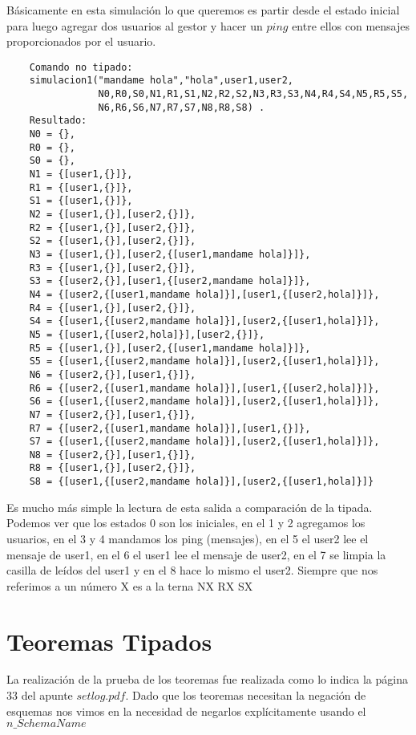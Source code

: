 Básicamente en esta simulación lo que queremos es partir desde el estado inicial para luego agregar dos usuarios al gestor y hacer un $ping$ entre ellos con mensajes proporcionados por el usuario.
\begin{verbatim}
    Comando no tipado:
    simulacion1("mandame hola","hola",user1,user2, 
                N0,R0,S0,N1,R1,S1,N2,R2,S2,N3,R3,S3,N4,R4,S4,N5,R5,S5,
                N6,R6,S6,N7,R7,S7,N8,R8,S8) .
    Resultado:
    N0 = {},  
    R0 = {},  
    S0 = {},  
    N1 = {[user1,{}]},  
    R1 = {[user1,{}]},  
    S1 = {[user1,{}]},  
    N2 = {[user1,{}],[user2,{}]},  
    R2 = {[user1,{}],[user2,{}]},  
    S2 = {[user1,{}],[user2,{}]},  
    N3 = {[user1,{}],[user2,{[user1,mandame hola]}]},  
    R3 = {[user1,{}],[user2,{}]},  
    S3 = {[user2,{}],[user1,{[user2,mandame hola]}]},  
    N4 = {[user2,{[user1,mandame hola]}],[user1,{[user2,hola]}]},  
    R4 = {[user1,{}],[user2,{}]},  
    S4 = {[user1,{[user2,mandame hola]}],[user2,{[user1,hola]}]},  
    N5 = {[user1,{[user2,hola]}],[user2,{}]},  
    R5 = {[user1,{}],[user2,{[user1,mandame hola]}]},  
    S5 = {[user1,{[user2,mandame hola]}],[user2,{[user1,hola]}]},  
    N6 = {[user2,{}],[user1,{}]},  
    R6 = {[user2,{[user1,mandame hola]}],[user1,{[user2,hola]}]},  
    S6 = {[user1,{[user2,mandame hola]}],[user2,{[user1,hola]}]},  
    N7 = {[user2,{}],[user1,{}]},  
    R7 = {[user2,{[user1,mandame hola]}],[user1,{}]},  
    S7 = {[user1,{[user2,mandame hola]}],[user2,{[user1,hola]}]},  
    N8 = {[user2,{}],[user1,{}]},  
    R8 = {[user1,{}],[user2,{}]},  
    S8 = {[user1,{[user2,mandame hola]}],[user2,{[user1,hola]}]}
\end{verbatim}

Es mucho más simple la lectura de esta salida a comparación de la tipada. Podemos ver que los estados 0 son los iniciales, en  el 1 y 2 agregamos los usuarios, en el 3 y 4 mandamos los ping (mensajes), en el 5 el user2 lee el mensaje de user1, en el 6 el user1 lee el mensaje de user2, en el 7 se limpia la casilla de leídos del user1 y en el 8 hace lo mismo el user2. Siempre que nos referimos a un número X es a la terna NX RX SX

\section{Teoremas Tipados}
La realización de la prueba de los teoremas fue realizada como lo indica la página 33 del apunte $setlog.pdf$. Dado que los teoremas necesitan la negación de esquemas nos vimos en la necesidad de negarlos explícitamente usando el $n\_SchemaName$
